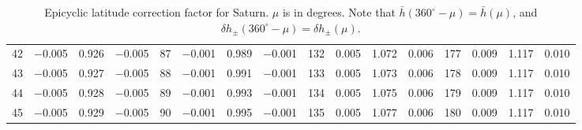 \begin{table}[!h]
{\begin{tabular}{rrrr|rrrr|rrrr|crrr}
 42 & \tiny{ $-$0.005} &   0.926 & \tiny{ $-$0.005} &  87 & \tiny{ $-$0.001} &   0.989 & \tiny{ $-$0.001} & 132 & \tiny{  0.005} &   1.072 & \tiny{  0.006} & 177 & \tiny{  0.009} &   1.117 & \tiny{  0.010}\\
 43 & \tiny{ $-$0.005} &   0.927 & \tiny{ $-$0.005} &  88 & \tiny{ $-$0.001} &   0.991 & \tiny{ $-$0.001} & 133 & \tiny{  0.005} &   1.073 & \tiny{  0.006} & 178 & \tiny{  0.009} &   1.117 & \tiny{  0.010}\\
 44 & \tiny{ $-$0.005} &   0.928 & \tiny{ $-$0.005} &  89 & \tiny{ $-$0.001} &   0.993 & \tiny{ $-$0.001} & 134 & \tiny{  0.005} &   1.075 & \tiny{  0.006} & 179 & \tiny{  0.009} &   1.117 & \tiny{  0.010}\\
 45 & \tiny{ $-$0.005} &   0.929 & \tiny{ $-$0.005} &  90 & \tiny{ $-$0.001} &   0.995 & \tiny{ $-$0.001} & 135 & \tiny{  0.005} &   1.077 & \tiny{  0.006} & 180 & \tiny{  0.009} &   1.117 & \tiny{  0.010}\\
\end{tabular}}
\caption{Epicyclic latitude correction factor for Saturn. $\mu$ is in degrees. Note that $\bar{h}(360^\circ-\mu) = \bar{h}(\mu)$, and $\delta h_{\pm}(360^\circ-\mu) = \delta h_{\pm}(\mu)$. }\label{tlat2s}
\end{table}

